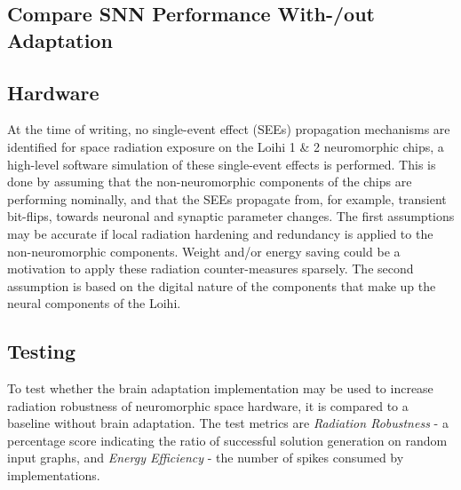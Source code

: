 \subsection{Compare SNN Performance With-/out Adaptation}\label{subsec:}



 


\subsection*{Hardware}\label{subsec:hardware}
At the time of writing, no single-event effect (SEEs) propagation mechanisms are identified for space radiation exposure on the Loihi 1 \& 2  neuromorphic chips, a high-level software simulation of these single-event effects is performed. This is done by assuming that the non-neuromorphic components of the chips are performing nominally, and that the SEEs propagate from, for example, transient bit-flips, towards neuronal and synaptic parameter changes. The first assumptions may be accurate if local radiation hardening and redundancy is applied to the non-neuromorphic components. Weight and/or energy saving could be a motivation to apply these radiation counter-measures sparsely. The second assumption is based on the digital nature of the components that make up the neural components of the Loihi. %




\subsection*{Testing}\label{subsec:testing}
To test whether the brain adaptation implementation may be used to increase radiation robustness of neuromorphic space hardware, it is compared to a baseline without brain adaptation. The test metrics are \textit{Radiation Robustness} - a percentage score indicating the ratio of successful solution generation on random input graphs, and \textit{Energy Efficiency} - the number of spikes consumed by implementations.

